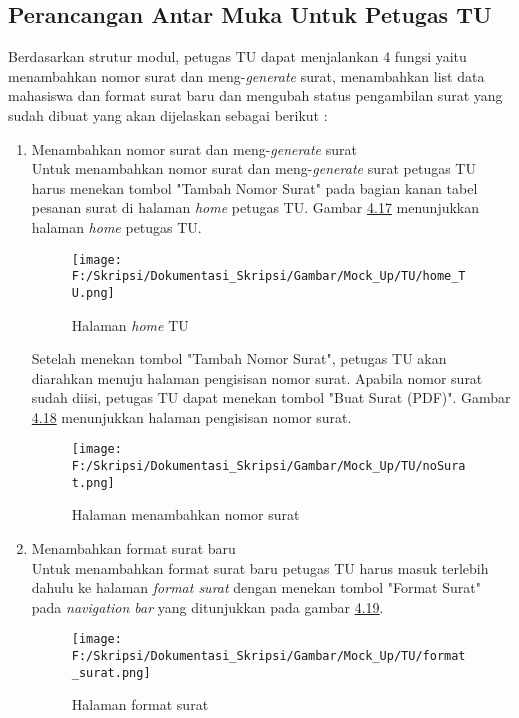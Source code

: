 \subsection{Perancangan Antar Muka Untuk Petugas TU}
\label{sec:perancangan_antar_muka_petugas_tu}
Berdasarkan strutur modul, petugas TU dapat menjalankan 4 fungsi yaitu menambahkan nomor surat dan meng-\textit{generate} surat, menambahkan list data mahasiswa dan format surat baru dan mengubah status pengambilan surat yang sudah dibuat yang akan dijelaskan sebagai berikut :
\begin{enumerate}
	\item Menambahkan nomor surat dan meng-\textit{generate} surat \\
	Untuk menambahkan nomor surat dan meng-\textit{generate} surat petugas TU harus menekan tombol "Tambah Nomor Surat" pada bagian kanan tabel pesanan surat di halaman \textit{home} petugas TU. Gambar \hyperlink{halaman_home_TU}{4.17} menunjukkan halaman \textit{home} petugas TU.
	\begin{figure}[H]
	\centering
		\texttt{[image: F:/Skripsi/Dokumentasi\_Skripsi/Gambar/Mock\_Up/TU/home\_TU.png]}
		\caption{Halaman \textit{home} TU}
		\label{fig:halaman_home_TU}
	\end{figure}
	
	Setelah menekan tombol "Tambah Nomor Surat", petugas TU akan diarahkan menuju halaman pengisisan nomor surat. Apabila nomor surat sudah diisi, petugas TU dapat menekan tombol "Buat Surat (PDF)". Gambar \hyperlink{isi_nomor_surat}{4.18} menunjukkan halaman pengisisan nomor surat.
	\begin{figure}[H]
	\centering
		\texttt{[image: F:/Skripsi/Dokumentasi\_Skripsi/Gambar/Mock\_Up/TU/noSurat.png]}
		\caption{Halaman menambahkan nomor surat}
		\label{fig:isi_nomor_surat}
	\end{figure}
	
	\item Menambahkan format surat baru\\
	Untuk menambahkan format surat baru petugas TU harus masuk terlebih dahulu ke halaman \textit{format surat} dengan menekan tombol "Format Surat" pada \textit{navigation bar} yang ditunjukkan pada gambar \hyperlink{halaman_format_surat}{4.19}.
	\begin{figure}[H]
	\centering
		\texttt{[image: F:/Skripsi/Dokumentasi\_Skripsi/Gambar/Mock\_Up/TU/format\_surat.png]}
		\caption{Halaman format surat}
		\label{fig:halaman_format_surat}
	\end{figure}
	

\end{enumerate}
